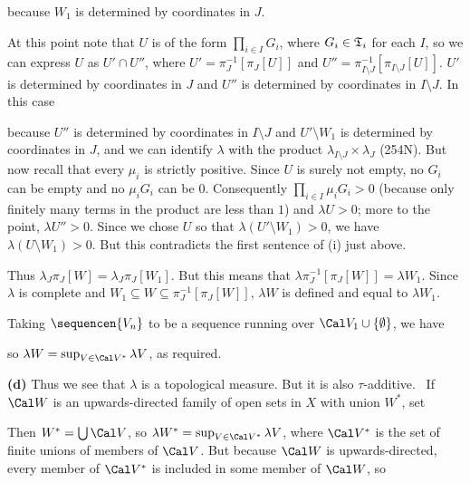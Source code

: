 {\noindent because $W_1$ is determined by coordinates in $J$.

At this point note that $U$ is of the form $\prod_{i\in I}G_i$, where
$G_i\in\frak T_i$ for each $I$, so we can express $U$ as $U'\cap U''$,
where $U'=\pi_J^{-1}[\pi_J[U]]$ and
$U''=\pi_{I\setminus J}^{-1}[\pi_{I\setminus J}[U]]$.
$U'$ is determined by coordinates in $J$ and $U''$ is determined by
coordinates in $I\setminus J$.   In this case


\noindent because $U''$ is determined by coordinates in $I\setminus J$
and $U'\setminus W_1$ is determined by coordinates in $J$,
and we can identify $\lambda$ with the product
$\lambda_{I\setminus J}\times\lambda_J$
(254N).   But now recall that every $\mu_i$ is strictly positive.
Since $U$ is
surely not empty, no $G_i$ can be empty and no $\mu_iG_i$ can be $0$.
Consequently $\prod_{i\in I}\mu_iG_i>0$ (because only finitely
many terms in the product are less than $1$) and $\lambda U>0$;  more to
the point, $\lambda U''>0$.   Since we chose $U$ so that
$\lambda(U'\setminus W_1)>0$, we have $\lambda(U\setminus W_1)>0$.   But
this contradicts the first sentence of (i) just above.\ \Bang

\medskip

 Thus $\lambda_J\pi_J[W]=\lambda_J\pi_J[W_1]$.   But
this means that $\lambda\pi_J^{-1}[\pi_J[W]]=\lambda W_1$.   Since
$\lambda$ is complete and $W_1\subseteq W\subseteq\pi_J^{-1}[\pi_J[W]]$,
$\lambda W$ is defined and equal to $\lambda W_1$.

Taking $\sequencen{V_n}$ to be a sequence running over
$\Cal V_1\cup\{\emptyset\}$, we have


\noindent so $\lambda W=\sup_{V\in\Cal V^*}\lambda V$, as
required.\ \Qed

\medskip

{\bf (d)} Thus we see that $\lambda$ is a topological measure.   But it
is also $\tau$-additive.   \Prf\ If $\Cal W$ is an upwards-directed
family of open sets in $X$ with union $W^*$, set


\noindent Then $W^*=\bigcup\Cal V$, so $\lambda W^*=\sup_{V\in\Cal
V^*}\lambda V$, where $\Cal V^*$ is the set of finite unions of members
of $\Cal V$.   But because $\Cal W$ is upwards-directed, every member of
$\Cal V^*$ is included in some member of $\Cal W$, so

}
